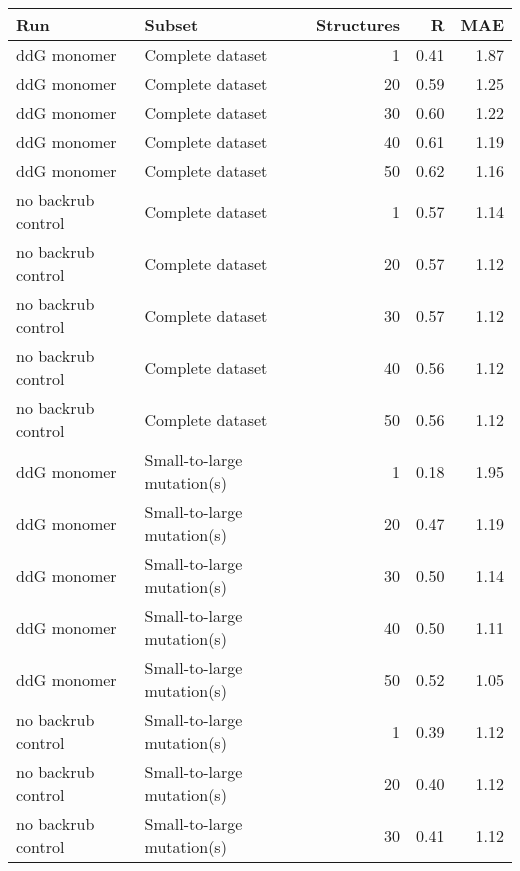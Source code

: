 \begin{table}
\begin{tabular}{llrrr}
\toprule
                Run &                               Subset &  Structures &    R &  MAE \\
\midrule
        ddG monomer &                     Complete dataset &           1 & 0.41 & 1.87 \\
        ddG monomer &                     Complete dataset &          20 & 0.59 & 1.25 \\
        ddG monomer &                     Complete dataset &          30 & 0.60 & 1.22 \\
        ddG monomer &                     Complete dataset &          40 & 0.61 & 1.19 \\
        ddG monomer &                     Complete dataset &          50 & 0.62 & 1.16 \\
 no backrub control &                     Complete dataset &           1 & 0.57 & 1.14 \\
 no backrub control &                     Complete dataset &          20 & 0.57 & 1.12 \\
 no backrub control &                     Complete dataset &          30 & 0.57 & 1.12 \\
 no backrub control &                     Complete dataset &          40 & 0.56 & 1.12 \\
 no backrub control &                     Complete dataset &          50 & 0.56 & 1.12 \\
        ddG monomer &           Small-to-large mutation(s) &           1 & 0.18 & 1.95 \\
        ddG monomer &           Small-to-large mutation(s) &          20 & 0.47 & 1.19 \\
        ddG monomer &           Small-to-large mutation(s) &          30 & 0.50 & 1.14 \\
        ddG monomer &           Small-to-large mutation(s) &          40 & 0.50 & 1.11 \\
        ddG monomer &           Small-to-large mutation(s) &          50 & 0.52 & 1.05 \\
 no backrub control &           Small-to-large mutation(s) &           1 & 0.39 & 1.12 \\
 no backrub control &           Small-to-large mutation(s) &          20 & 0.40 & 1.12 \\
 no backrub control &           Small-to-large mutation(s) &          30 & 0.41 & 1.12 \\

\end{tabular}
\end{table}
